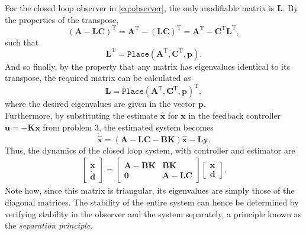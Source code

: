 For the closed loop observer in \eqref{eq:observer}, the only modifiable matrix is $\mathbf{L}$. By the properties of the transpose, 
\begin{equation*}
    (\mathbf{A} - \mathbf{LC})^\text{T} = \mathbf{A}^\text{T} - (\mathbf{LC})^\text{T} = \mathbf{A}^\text{T} - \mathbf{C}^\text{T} \mathbf{L}^\text{T},
\end{equation*}
such that
\begin{equation*}
    \mathbf{L}^\text{T} = \texttt{Place}(\mathbf{A}^\text{T}, \mathbf{C}^\text{T}, \mathbf{p}).
\end{equation*}
And so finally, by the property that any matrix has eigenvalues identical to its transpose, the required matrix can be calculated as
\begin{equation}
    \label{eq:est_pole_place}
    \mathbf{L} = \texttt{Place}(\mathbf{A}^\text{T}, \mathbf{C}^\text{T}, \mathbf{p})^\text{T},
\end{equation}
where the desired eigenvalues are given in the vector $\mathbf{p}$.\\
Furthermore, by substituting the estimate $\mathbf{\hat{x}}$ for $\mathbf{x}$ in the feedback controller $\mathbf{u} = -\mathbf{Kx}$ from problem 3, the estimated system becomes
\begin{equation}
    \mathbf{\dot{\hat{x}}} = (\mathbf{A} - \mathbf{LC} - \mathbf{BK})\mathbf{\hat{x}} - \mathbf{L} \mathbf{y}.
\end{equation}
Thus, the dynamics of the closed loop system, with controller and estimator are 
\begin{align}
    \begin{bmatrix}
    \mathbf{\dot{x}} \\
        \mathbf{\dot{d}}
        \end{bmatrix}
    = \begin{bmatrix}
        \mathbf{A} - \mathbf{BK} & \mathbf{BK} \\
        \mathbf{0}               & \mathbf{A} - \mathbf{LC}
    \end{bmatrix}
    \begin{bmatrix}
        \mathbf{x} \\
        \mathbf{d}
    \end{bmatrix}.
\end{align}
Note how, since this matrix is triangular, its eigenvalues are simply those of the diagonal matrices. The stability of the entire system can hence be determined by verifying stability in the observer and the system separately,\cite{StackExchange} a principle known as the \textit{separation principle}.\cite{Chen2014}\\\\
